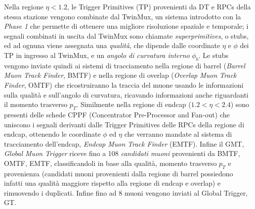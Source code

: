 Nella regione $\eta < 1.2$, le Trigger Primitives (TP) provenienti da DT e RPCs della stessa stazione vengono combinate dal TwinMux, un sistema introdotto con la \textit{Phase 1} che permette di ottenere una migliore risoluzione spaziale e temporale; i segnali combinati in uscita dal TwinMux sono chiamate \textit{superprimitives}, o stubs, ed ad ognuna viene assegnata una \textit{qualità}, che dipende dalle coordinate $\eta$ e $\phi$ dei TP in ingresso al TwinMux, e un \textit{angolo di curvatura interno} $\phi_b$. Le stubs vengono inviate quindi ai sistemi di tracciamento nella regione di barrel (\textit{Barrel Muon Track Finder}, BMTF) e nella regione di overlap (\textit{Overlap Muon Track Finder}, OMTF) che ricostruiranno la traccia del muone usando le informazioni sulla qualità e sull'angolo di curvatura, ricavando informazioni anche riguardanti il momento trasverso $p_T$. \newline
Similmente nella regione di endcap ($1.2 < \eta < 2.4$) sono presenti delle schede CPPF (Concentrator Pre-Processor and Fan-out) che uniscono i segnali derivanti dalle Trigger Primitives delle RPCs della regione di endcap, ottenendo le coordinate $\phi$ ed $\eta$ che verranno mandate al sistema di tracciamento dell'endcap, \textit{Endcap Muon Track Finder} (EMTF). \newline
Infine il GMT, \textit{Global Muon Trigger} riceve fino a 108 \textit{candidati muoni} provenienti da BMTF, OMTF, EMTF, classificandoli in base alla qualità, momento trasverso $p_T$ e provenienza (candidati muoni provenienti dalla regione di barrel possiedono infatti una qualità maggiore rispetto alla regione di endcap e overlap) e rimuovendo i duplicati. Infine fino ad 8 muoni vengono inviati al Global Trigger, GT. 







